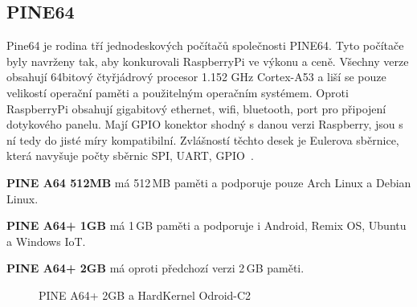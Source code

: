 	\subsection{PINE64}
Pine64 je rodina tří jednodeskových počítačů společnosti PINE64. Tyto počítače byly navrženy tak, aby konkurovali RaspberryPi ve výkonu a ceně. Všechny verze obsahují 64bitový čtyřjádrový procesor 1.152 GHz Cortex-A53 a liší se pouze velikostí operační paměti a použitelným operačním systémem. Oproti RaspberryPi obsahují gigabitový ethernet, wifi, bluetooth, port pro připojení dotykového panelu. Mají GPIO konektor shodný s danou verzi Raspberry, jsou s ní tedy do jisté míry kompatibilní. Zvlášností těchto desek je Eulerova sběrnice, která navyšuje počty sběrnic SPI, UART, GPIO~\cite{Pine64}.

\textbf{PINE A64 512MB} má 512\,MB paměti a podporuje pouze Arch Linux a Debian Linux.

\textbf{PINE A64+ 1GB} má 1\,GB paměti a podporuje i Android, Remix OS, Ubuntu a Windows IoT.

\textbf{PINE A64+ 2GB} má oproti předchozí verzi 2\,GB paměti.

	\begin{figure}[!ht]
    \centering
			\hspace*{5mm}
			\caption{PINE A64+ 2GB a HardKernel Odroid-C2}
\end{figure}

